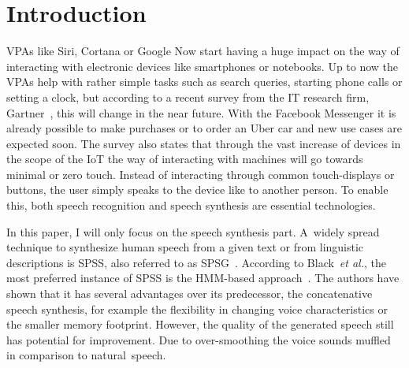 

\section{Introduction}
\label{sec:introduction}

\acp{VPA} like Siri, Cortana or Google Now start having a huge impact on the way of interacting with electronic devices like smartphones or notebooks. Up to now the \acp{VPA} help with rather simple tasks such as search queries, starting phone calls or setting a clock, but according to a recent survey from the IT research firm, Gartner~\cite{gartner:assistants}, this will change in the near future. With the Facebook Messenger it is already possible to make purchases or to order an Uber car and new use cases are expected soon. The survey also states that through the vast increase of devices in the scope of the \ac{IoT} the way of interacting with machines will go towards minimal or zero touch. Instead of interacting through common touch-displays or buttons, the user simply speaks to the device like to another person. To enable this, both speech recognition and speech synthesis are essential technologies.

In this paper, I will only focus on the speech synthesis part. A~widely spread technique to synthesize human speech from a given text or from linguistic descriptions is \acf{SPSS}, also referred to as \ac{SPSG}~\cite{ling:deep}. According to Black~\textit{et al.}, the most preferred instance of \ac{SPSS} is the \ac{HMM}-based approach~\cite{black:statistical}. The authors have shown that it has several advantages over its predecessor, the concatenative speech synthesis, for example the flexibility in changing voice characteristics or the smaller memory footprint. However, the quality of the generated speech still has potential for improvement. Due to over-smoothing the voice sounds muffled in comparison to natural~speech.

